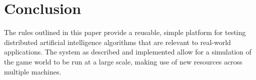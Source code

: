 \section{Conclusion}

The rules outlined in this paper provide a reusable, simple platform for testing distributed artificial intelligence algorithms that are relevant to real-world applications. The system as described and implemented allow for a simulation of the game world to be run at a large scale, making use of new resources across multiple machines.
